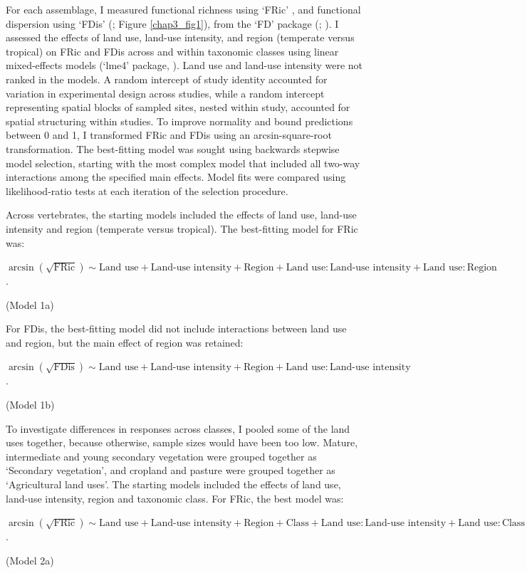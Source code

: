 For each assemblage, I measured functional richness using `FRic' \citep{Villeger2008}, and functional dispersion using `FDis’ (\citet{Laliberte2010}; Figure \ref{chap3_fig1}), from the `FD' package (\citet{Laliberte2010}; \citet{Laliberte2015}). I assessed the effects of land use, land-use intensity, and region (temperate versus tropical) on FRic and FDis across and within taxonomic classes using linear mixed-effects models (`lme4' package, \citet{Bates2015}). Land use and land-use intensity were not ranked in the models. A random intercept of study identity accounted for variation in experimental design across studies, while a random intercept representing spatial blocks of sampled sites, nested within study, accounted for spatial structuring within studies. To improve normality and bound predictions between 0 and 1, I transformed FRic and FDis using an arcsin-square-root transformation. The best-fitting model was sought using backwards stepwise model selection, starting with the most complex model that included all two-way interactions among the specified main effects. Model fits were compared using likelihood-ratio tests at each iteration of the selection procedure.

Across vertebrates, the starting models included the effects of land use, land-use intensity and region (temperate versus tropical). The best-fitting model for FRic was:
\pagebreak
\begin{center}
$\arcsin(\sqrt{\text{FRic}})\sim \text{Land use} + \text{Land-use intensity} + \text{Region} + \text{Land use}:\text{Land-use intensity} + \text{Land use}:\text{Region}$.\\
\end{center}
\hspace*{\fill}(Model 1a)

For FDis, the best-fitting model did not include interactions between land use and region, but the main effect of region was retained:
\begin{center}
$\arcsin(\sqrt{\text{FDis}})\sim \text{Land use} + \text{Land-use intensity} + \text{Region} + \text{Land use}:\text{Land-use intensity}$.\\
\end{center}
\hspace*{\fill}(Model 1b)

To investigate differences in responses across classes, I pooled some of the land uses together, because otherwise, sample sizes would have been too low. Mature, intermediate and young secondary vegetation were grouped together as `Secondary vegetation', and cropland and pasture were grouped together as `Agricultural land uses'. The starting models included the effects of land use, land-use intensity, region and taxonomic class. For FRic, the best model was:
\begin{center}
$\arcsin(\sqrt{\text{FRic}})\sim \text{Land use} + \text{Land-use  intensity} + \text{Region} + \text{Class} + \text{Land use}:\text{Land-use intensity} + \text{Land use}:\text{Class} + \text{Land-use intensity}:\text{Region} + \text{Class}:\text{Region}$.\\
\end{center}
\hspace*{\fill}(Model 2a)

